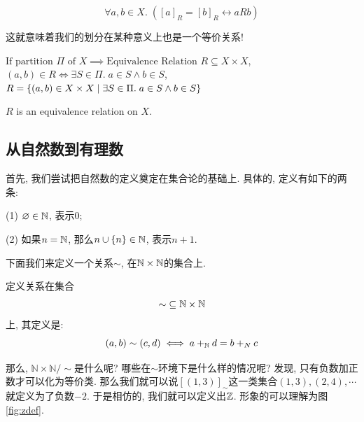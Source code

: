 \begin{theorem}
  \[
    \forall a, b \in X.\; ([a]_{R} = [b]_{R} \leftrightarrow a R b)
  \]
\end{theorem}

这就意味着我们的划分在某种意义上也是一个等价关系! 

\begin{definition}
  $\text{If partition } \Pi \text{ of } X \implies \text{Equivalence Relation } R \subseteq X \times X$, $(a, b) \in R \iff \exists S \in \Pi.\; a \in S \land b \in S$, $R = \{(a, b) \in X \times X \mid \exists S \in \Pi.\; a \in S \land b \in S\}$
\end{definition}

\begin{theorem}
    $R$ is an equivalence relation on  $X$.
\end{theorem}

\subsection{从自然数到有理数}

首先, 我们尝试把自然数的定义奠定在集合论的基础上. 具体的, 定义有如下的两条: 

\begin{definition}[自然数的定义]
	(1) $\varnothing\in \mathbb{N} $, 表示0;
	
	(2) 如果$n=\mathbb{N} $, 那么$n\cup\{n\}\in \mathbb{N} $, 表示$n+1$. 
\end{definition} 

下面我们来定义一个关系$\sim$, 在$\mathbb{N} \times \mathbb{N} $的集合上.  
\begin{definition}
定义关系在集合
  \[
    \sim\; \subseteq \mathbb{N} \times \mathbb{N}
  \]
上, 其定义是: 
  \[
    (a, b) \sim (c, d) \iff a +_{\mathbb{N}} d = b +_{N} c
  \]
\end{definition}

那么, $\mathbb{N} \times \mathbb{N}/\sim$是什么呢? 哪些在$\sim$环境下是什么样的情况呢? 发现, 只有负数加正数才可以化为等价类. 那么我们就可以说$[(1,3)]_\sim$这一类集合$(1,3),(2,4),\cdots$就定义为了负数$-2$. 于是相仿的, 我们就可以定义出$\mathbb{Z}$. 形象的可以理解为图\ref{fig:zdef}.

